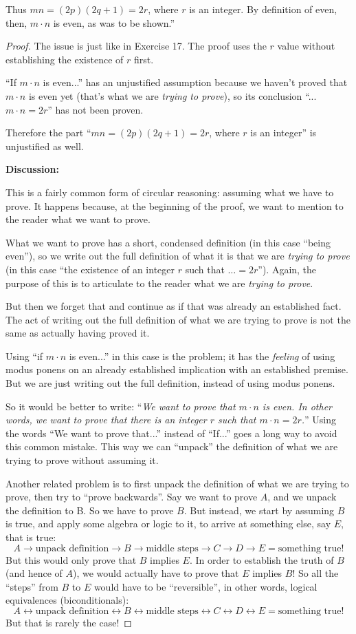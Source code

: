 \documentclass[14pt]{extarticle}
\newcommand{\bic}{\leftrightarrow}
\begin{document}
Thus $mn = (2p)(2q + 1) = 2r$, where $r$ is an integer. By definition of even, then, $m\cdot n$ is even, as was to be shown.”

\begin{proof}
The issue is just like in Exercise 17. The proof uses the $r$ value without establishing the existence of $r$ first. 

``If $m \cdot n$ is even...'' has an unjustified assumption because we haven't proved that $m \cdot n$ is even yet (that's what we are {\it trying to prove}), so its conclusion ``...$m\cdot n = 2r$'' has not been proven.

Therefore the part ``$mn = (2p)(2q + 1) = 2r$, where $r$ is an integer'' is unjustified as well.

{\bf Discussion:}

This is a fairly common form of circular reasoning: assuming what we have to prove. It happens because, at the beginning of the proof, we want to mention to the reader what we want to prove. 

What we want to prove has a short, condensed definition (in this case ``being even''), so we write out the full definition of what it is that we are {\it trying to prove} (in this case ``the existence of an integer $r$ such that $\ldots = 2r$''). Again, the purpose of this is to articulate to the reader what we are {\it trying to prove}.

But then we forget that and continue as if that was already an established fact. The act of writing out the full definition of what we are trying to prove is not the same as actually having proved it.

Using ``if $m\cdot n$ is even...'' in this case is the problem; it has the {\it feeling} of using modus ponens on an already established implication with an established premise. But we are just writing out the full definition, instead of using modus ponens.

So it would be better to write: ``{\it We want to prove that $m\cdot n$ is even. In other words, we want to prove that there is an integer $r$ such that $m \cdot n = 2r$.}'' Using the words ``We want to prove that...'' instead of ``If...'' goes a long way to avoid this common mistake. This way we can ``unpack'' the definition of what we are trying to prove without assuming it.

Another related problem is to first unpack the definition of what we are trying to prove, then try to ``prove backwards''. Say we want to prove $A$, and we unpack the definition to B. So we have to prove $B$. But instead, we start by assuming $B$ is true, and apply some algebra or logic to it, to arrive at something else, say $E$, that is true:
\[
A \to \text{unpack definition} \to B \to \text{middle steps} \to C \to D \to E = \text{something true!}
\]
But this would only prove that $B$ implies $E$. In order to establish the truth of $B$ (and hence of $A$), we would actually have to prove that $E$ implies $B$! So all the ``steps'' from $B$ to $E$ would have to be ``reversible'', in other words, logical equivalences (biconditionals):
\[
A \bic \text{unpack definition} \bic B \bic \text{middle steps} \bic C \bic D \bic E = \text{something true!}
\]
But that is rarely the case!
\end{proof}
\end{document}
